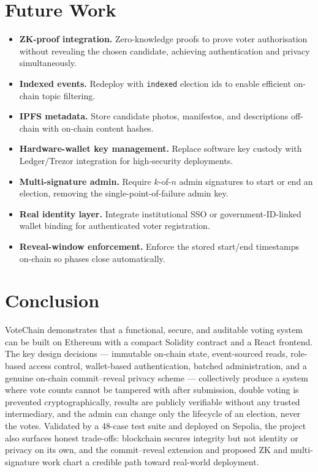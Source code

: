 \documentclass[11pt]{article}
\begin{document}
\section{Future Work}
\begin{itemize}[nosep]
  \item \textbf{ZK-proof integration.} Zero-knowledge proofs to prove voter authorisation without revealing the chosen candidate, achieving authentication and privacy simultaneously.
  \item \textbf{Indexed events.} Redeploy with \texttt{indexed} election ids to enable efficient on-chain topic filtering.
  \item \textbf{IPFS metadata.} Store candidate photos, manifestos, and descriptions off-chain with on-chain content hashes.
  \item \textbf{Hardware-wallet key management.} Replace software key custody with Ledger/Trezor integration for high-security deployments.
  \item \textbf{Multi-signature admin.} Require $k$-of-$n$ admin signatures to start or end an election, removing the single-point-of-failure admin key.
  \item \textbf{Real identity layer.} Integrate institutional SSO or government-ID-linked wallet binding for authenticated voter registration.
  \item \textbf{Reveal-window enforcement.} Enforce the stored start/end timestamps on-chain so phases close automatically.
\end{itemize}

\section{Conclusion}
VoteChain demonstrates that a functional, secure, and auditable voting system can be built on
Ethereum with a compact Solidity contract and a React frontend. The key design decisions ---
immutable on-chain state, event-sourced reads, role-based access control, wallet-based
authentication, batched administration, and a genuine on-chain commit--reveal privacy scheme
--- collectively produce a system where vote counts cannot be tampered with after submission,
double voting is prevented cryptographically, results are publicly verifiable without any
trusted intermediary, and the admin can change only the lifecycle of an election, never the
votes. Validated by a 48-case test suite and deployed on Sepolia, the project also surfaces
honest trade-offs: blockchain secures integrity but not identity or privacy on its own, and
the commit--reveal extension and proposed ZK and multi-signature work chart a credible path
toward real-world deployment.
\end{document}
